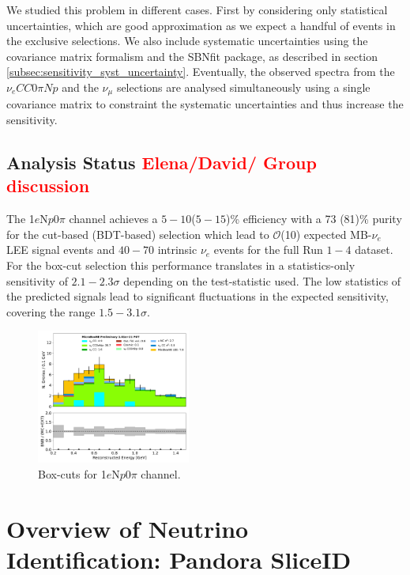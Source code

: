 \documentclass[a4paper]{article}
\newcommand{\nueccnopinp}{$\nu_e CC 0\pi Np$ }
\newcommand{\numu}{$\nu_{\mu}$ }
\newcommand{\npsel}{1$e$N$p$0$\pi$ }
\begin{document}
We studied this problem in different cases.
First by considering only statistical uncertainties, which are good approximation as we expect a handful of events in the exclusive selections.
We also include systematic uncertainties using the covariance matrix formalism and the SBNfit package, as described in section \ref{subsec:sensitivity_syst_uncertainty}.
Eventually, the observed spectra from the \nueccnopinp and the \numu selections are analysed simultaneously using a single covariance matrix to constraint the systematic uncertainties and thus increase the sensitivity.

\subsection{Analysis Status \textcolor{red}{Elena/David/ Group discussion}}

\par The \npsel channel achieves a $5-10$($5-15$)\% efficiency with a 73 (81)\% purity for the cut-based (BDT-based) selection which lead to $\mathcal{O}$(10) expected MB-$\nu_e$ LEE signal events and $40-70$ intrinsic $\nu_e$ events for the full Run $1-4$ dataset. For the box-cut selection this performance translates in a statistics-only sensitivity of $2.1-2.3\sigma$ depending on the test-statistic used. The low statistics of the predicted signals lead to significant fluctuations in the expected sensitivity, covering the range $1.5-3.1\sigma$. 

\begin{figure}[ht]
\begin{center}
\includegraphics[width=0.45\textwidth]{1eNp/reco_e_01162020_box_RUN1.pdf}
\caption{\label{fig:1eNp:box:RUN1}Box-cuts for \npsel channel.}
\end{center}
\end{figure}





\newpage

\section{Overview of Neutrino Identification: Pandora SliceID}
\label{sec:sliceID}

\end{document}

